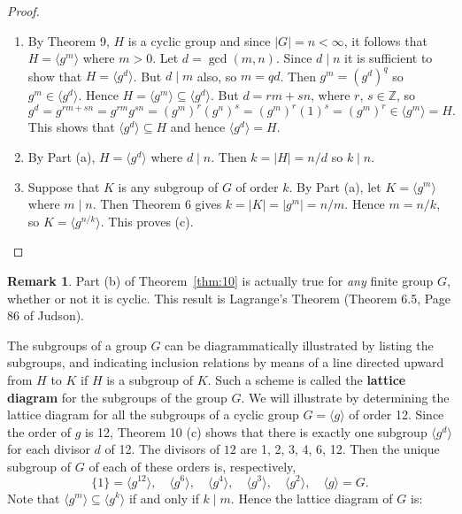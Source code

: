 \documentclass[11pt]{article}
\newcommand{\Z} {{\mathbb Z}}
\newcommand{\divides}{\ensuremath{\mid}}
\theoremstyle{plain}
\theoremstyle{definition}
\newtheorem{rem}[thm]{Remark}
\begin{document}
\begin{proof} \begin{enumerate}
\item By Theorem 9, $H$ is a cyclic group and since $|G|=n<\infty$,
it follows that $H=\langle g^m\rangle$ where $m>0$.  Let
$d=\gcd(m, n)$.  Since $d\divides n$ it is sufficient to show that
$H=\langle g^d\rangle$.  But $d\divides m$ also, so $m=qd$.  Then
$g^m=(g^d)^q$ so $g^m\in \langle g^d\rangle$.  Hence $H=\langle
g^m\rangle \subseteq \langle g^d\rangle$.  But $d=rm+ sn$, where
$r$, $s\in \Z$, so
$$g^d=g^{rm+sn}=g^{rm}g^{sn}=(g^m)^r(g^n)^s=(g^m)^r(1)^s=
(g^m)^r\in\langle g^m\rangle = H.$$
This shows that $\langle g^d \rangle \subseteq H$ and  hence
$\langle g^d\rangle = H$.

\item By Part (a), $H=\langle g^d\rangle$ where $d\divides n$.  Then $k=|H|=
n/d$ so $k\divides n$.

\item Suppose that $K$ is any subgroup of $G$ of order $k$.  By
Part (a), let $K=\langle g^m\rangle$ where $m\divides n$.  Then
Theorem 6 gives $k=|K| = |g^m| = n/m$.  Hence $m=n/k$, so
$K=\langle g^{n/k}\rangle$.  This proves (c).
\end{enumerate}
\end{proof}

\begin{rem} Part (b) of Theorem~\ref{thm:10} is actually true for {\it any} finite
group $G$, whether or not it is cyclic.  This result is Lagrange's
Theorem (Theorem 6.5, Page 86 of Judson).
\end{rem}


The subgroups of a group $G$ can be diagrammatically  illustrated
by listing the subgroups, and indicating inclusion relations by
means of a line directed upward from $H$ to $K$ if $H$ is a
subgroup of $K$.  Such a scheme is called the {\bf lattice
diagram} for the subgroups of the group $G$.  We will illustrate
by determining the lattice diagram for all the subgroups of a
cyclic group $G=\langle g\rangle$ of order 12.  Since the order of
$g$ is 12, Theorem 10 (c) shows that there is exactly one subgroup
$\langle g^d\rangle$ for each divisor $d$ of 12.  The divisors of
$12$ are 1, 2, 3, 4, 6, 12.  Then the unique subgroup of $G$ of
each of these orders is, respectively,
\[
\{1\}=\langle g^{12}\rangle,\quad \langle g^6\rangle, \quad
\langle g^4\rangle,\quad \langle g^3\rangle, \quad \langle
g^2\rangle , \quad \langle g\rangle = G.
\]
Note that $\langle
g^m\rangle \subseteq \langle g^k\rangle$ if and only if $k\divides m$.
Hence the lattice diagram of $G$ is:

\begin{center}
\end{center}
\end{document}
